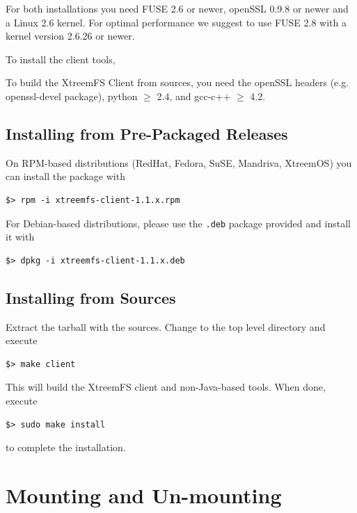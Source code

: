 \documentclass[a4paper,10pt]{book}
\begin{document}
For both installations you need FUSE 2.6 or newer, openSSL 0.9.8 or newer and a Linux 2.6 kernel. For optimal performance we suggest to use FUSE 2.8 with a kernel version 2.6.26 or newer.

To install the client tools, 

To build the XtreemFS Client from sources, you need the openSSL headers (e.g. openssl-devel package), python $\geq$ 2.4, and gcc-c++ $\geq$ 4.2.

\subsection{Installing from Pre-Packaged Releases}

On RPM-based distributions (RedHat, Fedora, SuSE, Mandriva, XtreemOS) you can install the package with


\begin{verbatim}
$> rpm -i xtreemfs-client-1.1.x.rpm
\end{verbatim}


For Debian-based distributions, please use the \texttt{.deb} package provided and install it with


\begin{verbatim}
$> dpkg -i xtreemfs-client-1.1.x.deb
\end{verbatim}



\subsection{Installing from Sources}

Extract the tarball with the sources. Change to the top level directory and execute

\begin{verbatim}
$> make client
\end{verbatim}

This will build the XtreemFS client and non-Java-based tools. When done, execute

\begin{verbatim}
$> sudo make install
\end{verbatim}

to complete the installation.


\section{Mounting and Un-mounting}
\label{sec:mount_vol}
\end{document}
